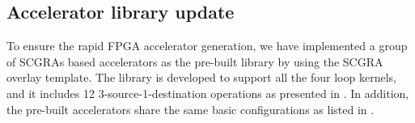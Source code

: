 \begin{table}
\footnotesize
\centering
\caption{QuickDough unrolling setup \label{tab:unrolling-setup}}{
}
\end{table}

\subsection{Accelerator library update} \label{subsec:lib-update}
To ensure the rapid FPGA accelerator generation, we have implemented a group of 
SCGRAs based accelerators as the pre-built library by using the SCGRA overlay template. 
The library is developed to support all the four loop kernels, and it includes 12 
3-source-1-destination operations as presented in . In addition, 
the pre-built accelerators share the same basic configurations as listed in 
.  

